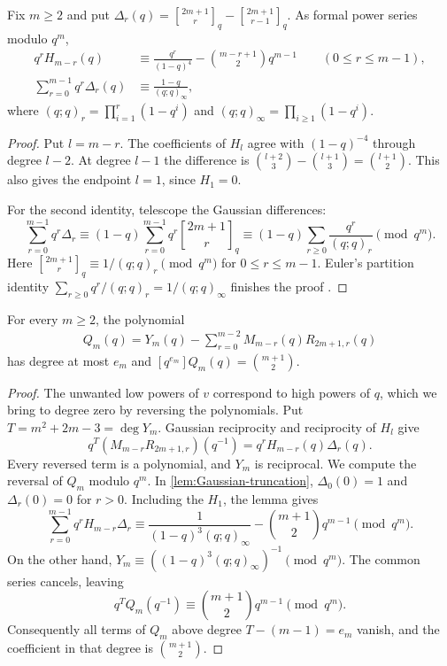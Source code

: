 \documentclass[a4paper,11pt]{amsart}
\numberwithin{equation}{subsection}
\theoremstyle{plain}
\theoremstyle{definition}
\theoremstyle{remark}
\newcommand{\qbinom}[2]{\genfrac{[}{]}{0pt}{}{#1}{#2}}
\begin{document}
\begin{lemma}\label{lem:Gaussian-truncation}
Fix $m\ge2$ and put
$\Delta_r(q)=\qbinom{2m+1}{r}_q-\qbinom{2m+1}{r-1}_q$.
As formal power series modulo $q^m$,
\begin{align*}
q^rH_{m-r}(q)&\equiv\frac{q^r}{(1-q)^4}
-\binom{m-r+1}{2}q^{m-1}\qquad(0\le r\le m-1),\\
\sum_{r=0}^{m-1}q^r\Delta_r(q)&\equiv
\frac{1-q}{(q;q)_\infty},
\end{align*}
where $(q;q)_r=\prod_{i=1}^r(1-q^i)$ and
$(q;q)_\infty=\prod_{i\ge1}(1-q^i)$.
\end{lemma}

\begin{proof}
Put $l=m-r$. The coefficients of $H_l$ agree with
$(1-q)^{-4}$ through degree $l-2$. At degree $l-1$ the
difference is $\binom{l+2}{3}-\binom{l+1}{3}=\binom{l+1}{2}$.
This also gives the endpoint $l=1$, since $H_1=0$.

For the second identity, telescope the Gaussian differences:
\[
\sum_{r=0}^{m-1}q^r\Delta_r
\equiv(1-q)\sum_{r=0}^{m-1}q^r\qbinom{2m+1}{r}_q
\equiv(1-q)\sum_{r\ge0}\frac{q^r}{(q;q)_r}
\pmod{q^m}.
\]
Here $\qbinom{2m+1}{r}_q\equiv1/(q;q)_r\pmod{q^m}$ for
$0\le r\le m-1$. Euler's partition identity
$\sum_{r\ge0}q^r/(q;q)_r=1/(q;q)_\infty$ finishes the proof
\cite[Chapter~I, Section~2, Example~4]{Macdonald}.
\end{proof}

\begin{lemma}\label{lem:Gaussian-cancellation}
For every $m\ge2$, the polynomial
\begin{gather*}
Q_m(q)=Y_m(q)-\sum_{r=0}^{m-2}M_{m-r}(q)R_{2m+1,r}(q)
\end{gather*}
has degree at most $e_m$ and
$[q^{e_m}]Q_m(q)=\binom{m+1}{2}$.
\end{lemma}

\begin{proof}
The unwanted low powers of $v$ correspond to high powers of $q$,
which we bring to degree zero by reversing the polynomials. Put
$T=m^2+2m-3=\deg Y_m$. Gaussian reciprocity and reciprocity of
$H_l$ give
\[
q^T(M_{m-r}R_{2m+1,r})(q^{-1})
=q^rH_{m-r}(q)\Delta_r(q).
\]
Every reversed term is a polynomial, and $Y_m$ is reciprocal.
We compute the reversal of $Q_m$ modulo $q^m$.
In \autoref{lem:Gaussian-truncation}, $\Delta_0(0)=1$ and
$\Delta_r(0)=0$ for $r>0$. Including the $H_1$,
the lemma gives
\[
\sum_{r=0}^{m-1}q^rH_{m-r}\Delta_r
\equiv\frac{1}{(1-q)^3(q;q)_\infty}
-\binom{m+1}{2}q^{m-1}\pmod{q^m}.
\]
On the other hand,
$Y_m\equiv((1-q)^3(q;q)_\infty)^{-1}\pmod{q^m}$.
The common series cancels, leaving
\[
q^TQ_m(q^{-1})\equiv\binom{m+1}{2}q^{m-1}\pmod{q^m}.
\]
Consequently all terms of $Q_m$ above degree $T-(m-1)=e_m$
vanish, and the coefficient in that degree is $\binom{m+1}{2}$.
\end{proof}
\end{document}
